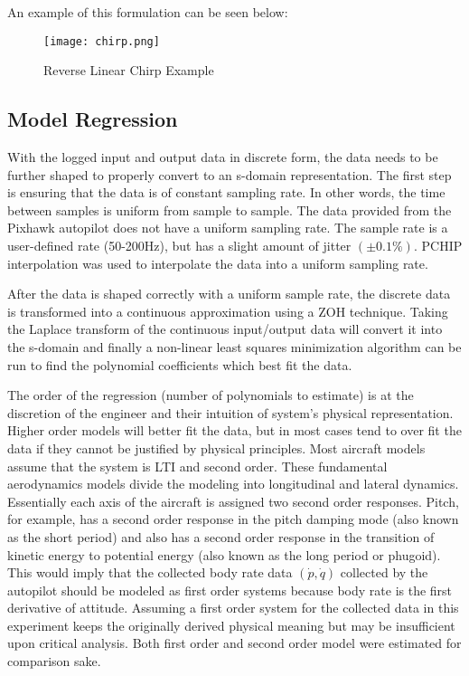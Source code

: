 An example of this formulation can be seen below:

\begin{figure}[!h]
 \centering
  \texttt{[image: chirp.png]}
  \caption{Reverse Linear Chirp Example}
  \label{fig:chirp}
\end{figure}

\subsection{Model Regression}
With the logged input and output data in discrete form, the data needs to be further shaped to properly convert to an s-domain representation.  The first step is ensuring that the data is of constant sampling rate.  In other words, the time between samples is uniform from sample to sample.  The data provided from the Pixhawk autopilot does not have a uniform sampling rate.  The sample rate is a user-defined rate (50-200Hz), but has a slight amount of jitter $(\pm 0.1\%)$.  \ac{PCHIP} interpolation was used to interpolate the data into a uniform sampling rate.

After the data is shaped correctly with a uniform sample rate, the discrete data is transformed into a continuous approximation using a \ac{ZOH} technique.  Taking the Laplace transform of the continuous input/output data will convert it into the s-domain and finally a non-linear least squares minimization algorithm can be run to find the polynomial coefficients which best fit the data.

The order of the regression (number of polynomials to estimate) is at the discretion of the engineer and their intuition of system's physical representation.  Higher order models will better fit the data, but in most cases tend to over fit the data if they cannot be justified by physical principles.  Most aircraft models assume that the system is \ac{LTI} and second order.  These fundamental aerodynamics models divide the modeling into longitudinal and lateral dynamics.  Essentially each axis of the aircraft is assigned two second order responses.  Pitch, for example, has a second order response in the pitch damping mode (also known as the short period) and also has a second order response in the transition of kinetic energy to potential energy (also known as the long period or phugoid).  This would imply that the collected body rate data $(\dot{p},\dot{q})$ collected by the autopilot should be modeled as first order systems because body rate is the first derivative of attitude.  Assuming a first order system for the collected data in this experiment keeps the originally derived physical meaning but may be insufficient upon critical analysis.  Both first order and second order model were estimated for comparison sake.

